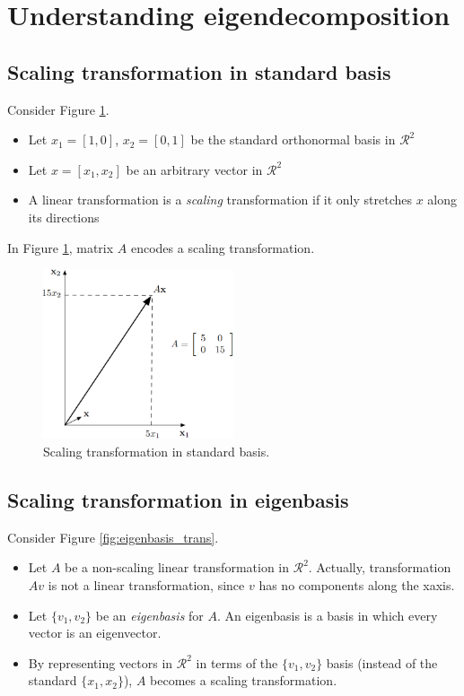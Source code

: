 \section{Understanding eigendecomposition}

\subsection{Scaling transformation in standard basis}
Consider Figure \ref{fig:scalar_trans}.
\begin{itemize}
    \item Let $x_1 = [1,0]$, $x_2 = [0,1]$ be the standard orthonormal basis in $\mathcal{R}^2$
    \item Let $x = [x_1, x_2]$ be an arbitrary vector in $\mathcal{R}^2$
    \item A linear transformation is a \textit{scaling} transformation if it only stretches $x$ along its directions
\end{itemize}

In Figure \ref{fig:scalar_trans}, matrix $A$ encodes a scaling transformation.

\begin{figure}
    \centering
    \includegraphics[width=0.5\textwidth]{images/scalingVector.png}
    \caption{Scaling transformation in standard basis.}
    \label{fig:scalar_trans}
\end{figure}

\subsection{Scaling transformation in eigenbasis}
Consider Figure \ref{fig:eigenbasis_trans}.
\begin{itemize}
    \item Let $A$ be a non-scaling linear transformation in $\mathcal{R}^2$. Actually, transformation $Av$ is not a linear transformation, since $v$ has no components along the x\-axis.
    
    \item Let $\{v_1, v_2\}$ be an \textit{eigenbasis} for $A$. An eigenbasis is a basis in which every vector is an eigenvector.
    
    \item By representing vectors in $\mathcal{R}^2$ in terms of the $\{v_1,v_2\}$ basis (instead of the standard $\{x_1, x_2\}$), $A$ becomes a scaling transformation.
\end{itemize}

